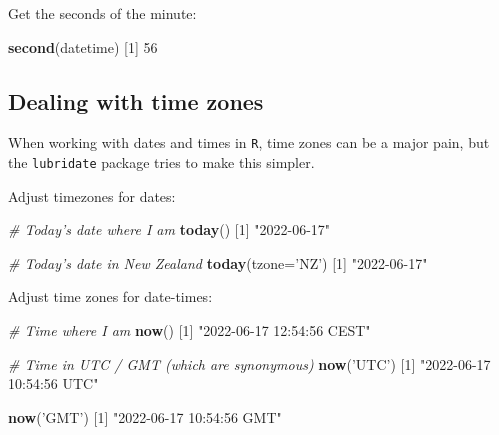\documentclass[]{book}
\newenvironment{Shaded}{\begin{snugshade}}{\end{snugshade}}
\newcommand{\CommentTok}[1]{\textcolor[rgb]{0.56,0.35,0.01}{\textit{#1}}}
\newcommand{\DataTypeTok}[1]{\textcolor[rgb]{0.13,0.29,0.53}{#1}}
\newcommand{\DecValTok}[1]{\textcolor[rgb]{0.00,0.00,0.81}{#1}}
\newcommand{\KeywordTok}[1]{\textcolor[rgb]{0.13,0.29,0.53}{\textbf{#1}}}
\newcommand{\NormalTok}[1]{#1}
\newcommand{\StringTok}[1]{\textcolor[rgb]{0.31,0.60,0.02}{#1}}
\begin{document}
Get the seconds of the minute:

\begin{Shaded}
\begin{Highlighting}[]
\KeywordTok{second}\NormalTok{(datetime)}
\NormalTok{[}\DecValTok{1}\NormalTok{] }\DecValTok{56}
\end{Highlighting}
\end{Shaded}

\hypertarget{dealing-with-time-zones}{%
\subsection*{Dealing with time zones}\label{dealing-with-time-zones}}

When working with dates and times in \texttt{R}, time zones can be a major pain, but the \texttt{lubridate} package tries to make this simpler.

Adjust timezones for dates:

\begin{Shaded}
\begin{Highlighting}[]
\CommentTok{# Today's date where I am}
\KeywordTok{today}\NormalTok{()}
\NormalTok{[}\DecValTok{1}\NormalTok{] }\StringTok{"2022-06-17"}

\CommentTok{# Today's date in New Zealand}
\KeywordTok{today}\NormalTok{(}\DataTypeTok{tzone=}\StringTok{'NZ'}\NormalTok{)}
\NormalTok{[}\DecValTok{1}\NormalTok{] }\StringTok{"2022-06-17"}
\end{Highlighting}
\end{Shaded}

Adjust time zones for date-times:

\begin{Shaded}
\begin{Highlighting}[]
\CommentTok{# Time where I am}
\KeywordTok{now}\NormalTok{()}
\NormalTok{[}\DecValTok{1}\NormalTok{] }\StringTok{"2022-06-17 12:54:56 CEST"}

\CommentTok{# Time in UTC / GMT (which are synonymous)}
\KeywordTok{now}\NormalTok{(}\StringTok{'UTC'}\NormalTok{)}
\NormalTok{[}\DecValTok{1}\NormalTok{] }\StringTok{"2022-06-17 10:54:56 UTC"}

\KeywordTok{now}\NormalTok{(}\StringTok{'GMT'}\NormalTok{)}
\NormalTok{[}\DecValTok{1}\NormalTok{] }\StringTok{"2022-06-17 10:54:56 GMT"}
\end{Highlighting}
\end{Shaded}
\end{document}
